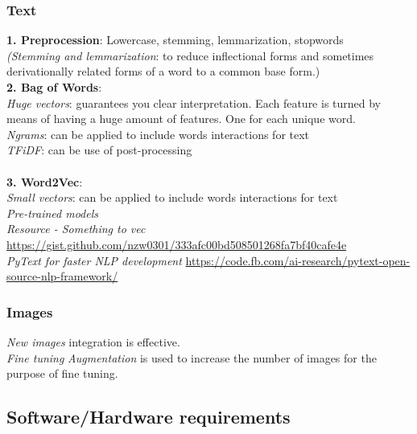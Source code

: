 \documentclass[11pt, twoside]{article}   	%
\begin{document}
\subsubsection{Text}
\textbf{1. Preprocession}: Lowercase, stemming, lemmarization, stopwords
\\\indent \textit{(Stemming and lemmarization}: to reduce inflectional forms and sometimes derivationally related forms of a word to a common base form.)
\\\textbf{2. Bag of Words}: 
\\\indent \textit{Huge vectors}: guarantees you clear interpretation. Each feature is turned by means of having a huge amount of features. One for each unique word. 
\\\indent \textit{Ngrams}: can be applied to include words interactions for text
\\\indent \textit{TFiDF}: can be use of post-processing 
\\
\\\textbf{3. Word2Vec}:
\\\indent \textit{Small vectors}: can be applied to include words interactions for text
\\\indent \textit{Pre-trained models}
\\\indent \textit{Resource - Something to vec } \url{https://gist.github.com/nzw0301/333afc00bd508501268fa7bf40cafe4e}
\\\indent \textit{PyText for faster NLP development} \url{https://code.fb.com/ai-research/pytext-open-source-nlp-framework/}

\subsubsection{Images}
\textit{New images} integration is effective.
\\\textit{Fine tuning} 
\textit{Augmentation} is used to increase the number of images for the purpose of fine tuning.


\subsection{Software/Hardware requirements}
\paragraph{}
\textup{} 

\end{document}
